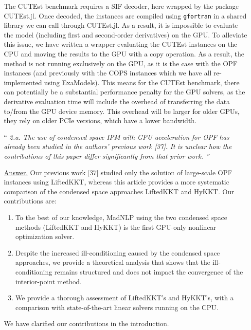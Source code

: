 \documentclass[10pt,a4paper]{article}
\newenvironment{quotereviewer}{\vspace{.5cm}{\underline\reviewername} ``\it\footnotesize}{''}
\newcommand{\answer}{\vspace{1mm}\underline{Answer.} }
\begin{document}
The CUTEst benchmark requires a SIF decoder, here wrapped by the package CUTEst.jl. Once decoded,
the instances are compiled using {\tt gfortran} in a shared library we can
call through CUTEst.jl. As a result, it is impossible to evaluate the model
(including first and second-order derivatives) on the GPU. To alleviate this issue,
we have written a wrapper evaluating the CUTEst instances on the CPU and moving
the results to the GPU with a copy operation. As a result, the method is not running exclusively on the GPU,
as it is the case with the OPF instances (and previously with the COPS instances which
we have all re-implemented using ExaModels).
This means for the CUTEst benchmark, there can potentially be a substantial performance penalty
for the GPU solvers, as the derivative evaluation time will include the overhead of transferring
the data to/from the GPU device memory.
This overhead will be larger for older GPUs, they rely on older PCIe versions, which have a lower bandwidth.

\begin{quotereviewer}
2.a. The use of condensed-space IPM with GPU acceleration for OPF has already been
studied in the authors’ previous work [37]. It is unclear how the contributions of this
paper differ signiﬁcantly from that prior work.
\end{quotereviewer}

\answer
Our previous work [37] studied only the solution of large-scale OPF instances
using LiftedKKT,
whereas this article provides a more systematic comparison of the condensed
space approaches LiftedKKT and HyKKT. Our contributions are:
\begin{enumerate}
  \item To the best of our knowledge, MadNLP using the two condensed space methods
    (LiftedKKT and HyKKT) is the first GPU-only nonlinear optimization solver.
  \item Despite the increased ill-conditioning caused by the condensed space approaches,
    we provide a theoretical analysis that shows that the ill-conditioning remains
    structured and does not impact the convergence of the interior-point method.
  \item We provide a thorough assessment of LiftedKKT's and HyKKT's, with a comparison
    with state-of-the-art linear solvers running on the CPU.
\end{enumerate}
We have clarified our contributions in the introduction.
\end{document}
